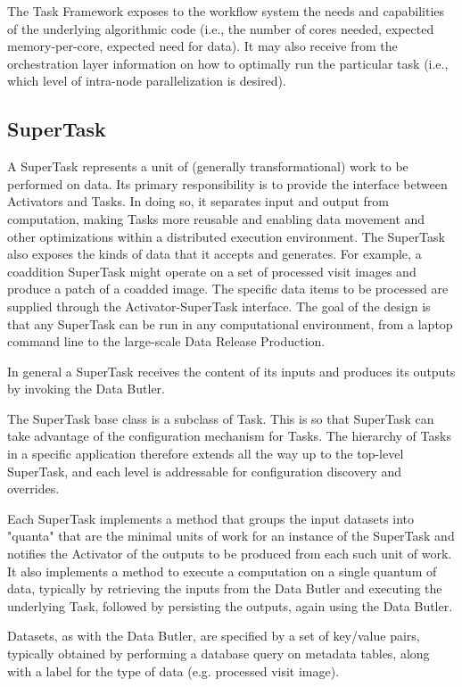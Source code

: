 \documentclass[DM,toc]{lsstdoc}
\begin{document}
The Task Framework exposes to the workflow system the needs and capabilities
of the underlying algorithmic code (i.e., the number of cores needed, expected
memory-per-core, expected need for data). It may also receive from the
orchestration layer information on how to optimally run the particular task
(i.e., which level of intra-node parallelization is desired).


\subsection{SuperTask}\label{supertask}

A SuperTask represents a unit of (generally transformational) work to be
performed on data.  Its primary responsibility is to provide the interface
between Activators and Tasks.  In doing so, it separates input and output from
computation, making Tasks more reusable and enabling data movement and other
optimizations within a distributed execution environment.  The SuperTask also
exposes the kinds of data that it accepts and generates.  For example, a
coaddition SuperTask might operate on a set of processed visit images and
produce a patch of a coadded image.  The specific data items to be processed
are supplied through the Activator-SuperTask interface.  The goal of the
design is that any SuperTask can be run in any computational environment,
from a laptop command line to the large-scale Data Release Production.

In general a SuperTask receives the content of its inputs and produces its
outputs by invoking the Data Butler.

The SuperTask base class is a subclass of Task. This is so that SuperTask can
take advantage of the configuration mechanism for Tasks. The hierarchy of Tasks
in a specific application therefore extends all the way up to the top-level
SuperTask, and each level is addressable for configuration discovery and
overrides.

Each SuperTask implements a method that groups the input datasets into "quanta"
that are the minimal units of work for an instance of the SuperTask and
notifies the Activator of the outputs to be produced from each such unit of
work.  It also implements a method to execute a computation on a single quantum
of data, typically by retrieving the inputs from the Data Butler and executing
the underlying Task, followed by persisting the outputs, again using the Data
Butler.

Datasets, as with the Data Butler, are specified by a set of key/value pairs,
typically obtained by performing a database query on metadata tables, along
with a label for the type of data (e.g. processed visit image).
\end{document}
